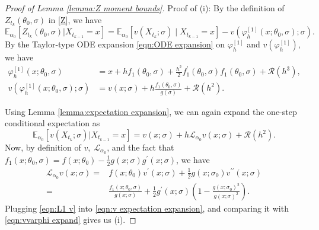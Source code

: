 \documentclass[a4paper,12pt]{article}
\numberwithin{equation}{section}
\theoremstyle{plain}
\theoremstyle{definition}
\begin{document}
\begin{appendix}
\begin{proof}[Proof of Lemma \ref{lemma:Z moment bounds}]
     Proof of (i): By the definition of $Z_{t_k}(\theta_0,\sigma)$ in \eqref{Z}, we have
    \begin{equation*}
        \mathbb{E}_{\alpha_0}\left[Z_{t_k}\left(\theta_0,\sigma\right)|X_{t_{k-1}}=x\right]=\mathbb{E}_{\alpha_0}\left[v\left(X_{t_k} ; \sigma\right) \mid X_{t_{k-1}}=x\right]-v\left(\varphi_h^{[1]}\left(x ; \theta_0,\sigma\right) ; \sigma\right).
    \end{equation*}
    By the Taylor-type ODE expansion \eqref{eqn:ODE expansion} on $\varphi^{[1]}_h$ and $v(\varphi^{[1]}_h)$, we have 
    \begin{align}
        \varphi_h^{[1]}(x;\theta_0,\sigma)&=x+hf_1(\theta_0,\sigma)+\frac{h^2}{2}f_1^{\prime}(\theta_0,\sigma)f_1(\theta_0,\sigma)+\mathcal{R}(h^3),\nonumber\\
        v(\varphi_h^{[1]}(x;\theta_0,\sigma);\sigma)&=v(x;\sigma)+h\frac{f_1(\theta_0,\sigma)}{g(\sigma)}+\mathcal{R}(h^2).\label{eqn:vvarphi expand}
    \end{align}
   
    Using Lemma \ref{lemma:expectation expansion}, we can again expand the one-step conditional expectation as
    \begin{equation}
        \mathbb{E}_{\alpha_0}[v(X_{t_k};\sigma)|X_{t_{k-1}}=x]=v(x;\sigma)+h\mathcal{L}_{\alpha_0}v(x;\sigma)+\mathcal{R}(h^2) \label{eqn:v expectation expansion}.
    \end{equation}
    Now, by definition of $v,\; \mathcal{L}_{\alpha_0}$, and the fact that $f_1(x;\theta_0,\sigma)=f(x;\theta_0)-\frac{1}{2}g(x;\sigma)g^\prime(x;\sigma)$, we have
    \begin{align}
        \mathcal{L}_{\alpha_0}v(x;\sigma)=&f(x;\theta_0)v^\prime(x;\sigma)+\frac{1}{2}g(x;\sigma_0)v^{\prime\prime}(x;\sigma)\nonumber\\
        =&\frac{f_1(x;\theta_0,\sigma)}{g(x;\sigma)}+\frac{1}{2}g^\prime(x;\sigma)\left(1-\frac{g(x;\sigma_0)^2}{g(x;\sigma)^2}\right).\label{eqn:L1 v}
    \end{align}
    Plugging  \eqref{eqn:L1 v} into \eqref{eqn:v expectation expansion}, and comparing it with \eqref{eqn:vvarphi expand} gives us (i).
    

\end{proof}
\end{appendix}
\end{document}
